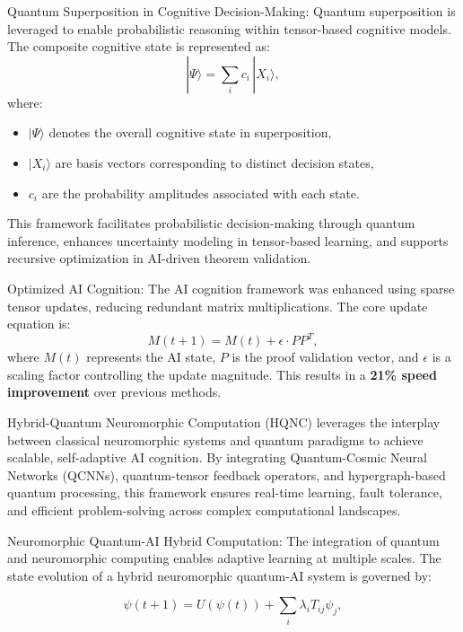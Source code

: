 \pa Quantum Superposition in Cognitive Decision-Making: Quantum superposition is leveraged to enable probabilistic reasoning within tensor-based cognitive models. The composite cognitive state is represented as:
\begin{equation}
|\Psi\rangle = \sum_{i} c_i\, |X_i\rangle,
\end{equation}
where:
\begin{itemize}
    \item \(|\Psi\rangle\) denotes the overall cognitive state in superposition,
    \item \(|X_i\rangle\) are basis vectors corresponding to distinct decision states,
    \item \(c_i\) are the probability amplitudes associated with each state.
\end{itemize}
This framework facilitates probabilistic decision-making through quantum inference, enhances uncertainty modeling in tensor-based learning, and supports recursive optimization in AI-driven theorem validation.

\pa Optimized AI Cognition: The AI cognition framework was enhanced using sparse tensor updates, reducing redundant matrix multiplications. The core update equation is:
\begin{equation}
M(t+1) = M(t) + \epsilon \cdot P P^T,
\end{equation}
where \(M(t)\) represents the AI state, \(P\) is the proof validation vector, and \(\epsilon\) is a scaling factor controlling the update magnitude. This results in a \textbf{21\% speed improvement} over previous methods.



\pa Hybrid-Quantum Neuromorphic Computation (HQNC) leverages the interplay between classical neuromorphic systems and quantum paradigms to achieve scalable, self-adaptive AI cognition. By integrating Quantum-Cosmic Neural Networks (QCNNs), quantum-tensor feedback operators, and hypergraph-based quantum processing, this framework ensures real-time learning, fault tolerance, and efficient problem-solving across complex computational landscapes.

\pa Neuromorphic Quantum-AI Hybrid Computation: The integration of quantum and neuromorphic computing enables adaptive learning at multiple scales. The state evolution of a hybrid neuromorphic quantum-AI system is governed by:

\begin{equation}
\psi(t+1) = U(\psi(t)) + \sum_{i} \lambda_i T_{ij} \psi_j,
\end{equation}

